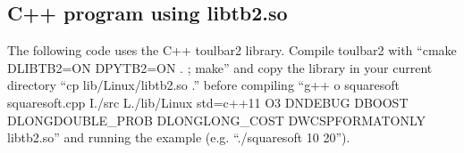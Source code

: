 \documentclass[letterpaper,10pt,openany,oneside,english]{sphinxmanual}
\begin{document}
\subsection{C++ program using libtb2.so}
\label{\detokenize{examples/tuto_sspp:c-program-using-libtb2-so}}
\sphinxAtStartPar
The following code uses the C++ toulbar2 library. Compile toulbar2 with “cmake \sphinxhyphen{}DLIBTB2=ON \sphinxhyphen{}DPYTB2=ON . ; make” and copy the library in your current directory “cp lib/Linux/libtb2.so .” before compiling “g++ \sphinxhyphen{}o squaresoft squaresoft.cpp \sphinxhyphen{}I./src \sphinxhyphen{}L./lib/Linux \sphinxhyphen{}std=c++11 \sphinxhyphen{}O3 \sphinxhyphen{}DNDEBUG \sphinxhyphen{}DBOOST \sphinxhyphen{}DLONGDOUBLE\_PROB \sphinxhyphen{}DLONGLONG\_COST \sphinxhyphen{}DWCSPFORMATONLY libtb2.so” and running the example (e.g. “./squaresoft 10 20”).

\sphinxAtStartPar
{}
\end{document}
